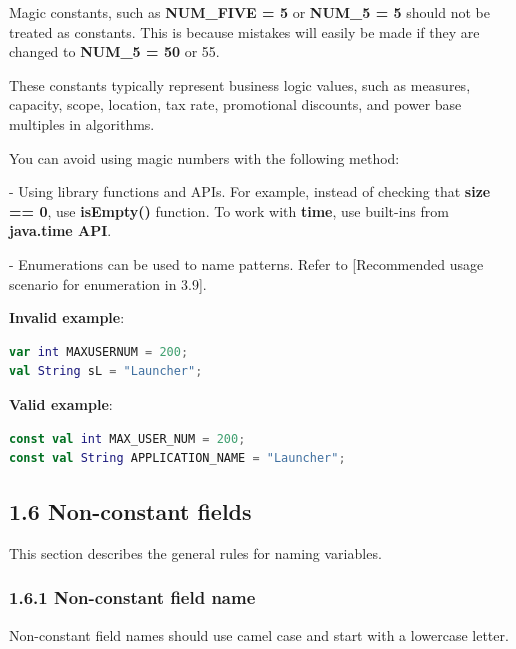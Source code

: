 {{{{{{{{Magic constants, such as \textbf{NUM_FIVE = 5} or \textbf{NUM_5 = 5} should not be treated as constants. This is because mistakes will easily be made if they are changed to \textbf{NUM_5 = 50} or 55.

These constants typically represent business logic values, such as measures, capacity, scope, location, tax rate, promotional discounts, and power base multiples in algorithms.

You can avoid using magic numbers with the following method:

- Using library functions and APIs. For example, instead of checking that \textbf{size == 0}, use \textbf{isEmpty()} function. To work with \textbf{time}, use built-ins from \textbf{java.time API}.

- Enumerations can be used to name patterns. Refer to [Recommended usage scenario for enumeration in 3.9].



\textbf{Invalid example}: 



\begin{lstlisting}[language=Kotlin]
var int MAXUSERNUM = 200;
val String sL = "Launcher";
\end{lstlisting}


\textbf{Valid example}:



\begin{lstlisting}[language=Kotlin]
const val int MAX_USER_NUM = 200;
const val String APPLICATION_NAME = "Launcher";
\end{lstlisting}


\subsection*{\textbf{1.6 Non-constant fields}}

\label{sec:1.6}

This section describes the general rules for naming variables.

\subsubsection*{\textbf{1.6.1 Non-constant field name}}
\leavevmode\newline

\label{sec:1.6.1}

Non-constant field names should use camel case and start with a lowercase letter.

}}}}}}}}
